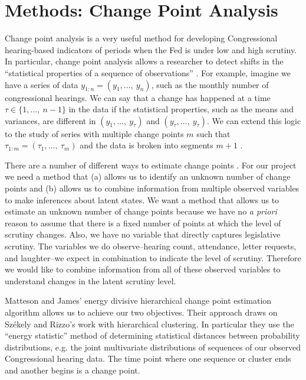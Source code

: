 \documentclass[a4paper]{article}\usepackage[]{graphicx}\usepackage[]{color}
\begin{document}
\section{Methods: Change Point Analysis}

Change point analysis is a very useful method for developing Congressional hearing-based indicators of periods when the Fed is under low and high scrutiny. In particular, change point analysis allows a researcher to detect shifts in the ``statistical properties of a sequence of observations'' \cite[2]{Killick2013}. For example, imagine we have a series of data $y_{1:n} = (y_{1},\ldots,\: y_{n})$, such as the monthly number of congressional hearings.  We can say that a change has happened at a time $\tau \in \{1,\ldots,\:n-1\}$ in the data if the statistical properties, such as the means and variances, are different in $(y_{1},\ldots,\: y_{\tau})$ and $(y_{\tau},\ldots,\: y_{\tau})$. We can extend this logic to the study of series with multiple change points $m$ such that $\tau_{1:m} = (\tau_{1},\ldots,\:\tau_{m})$ and the data is broken into segments $m + 1$ \citep{Killick2012}.

There are a number of different ways to estimate change points \cite[see][]{Killick2013,Matteson2014}. For our project we need a method that (a) allows us to identify an unknown number of change points and (b) allows us to combine information from multiple observed variables to make inferences about latent states. We want a method that allows us to estimate an unknown number of change points because we have no \emph{a priori} reason to assume that there is a fixed number of points at which the level of scrutiny changes. Also, we have no variable that directly captures legislative scrutiny. The variables we do observe--hearing count, attendance, letter requests, and laughter--we expect in combination to indicate the level of scrutiny. Therefore we would like to combine information from all of these observed variables to understand changes in the latent scrutiny level.

Matteson and James' \citeyearpar{Matteson2014} energy divisive hierarchical change point estimation algorithm allows us to achieve our two objectives. Their approach draws on Sz{\'e}kely and Rizzo's \citeyearpar{Szekely2005} work with hierarchical clustering. In particular they use the ``energy statistic'' method of determining statistical distances between probability distributions, e.g. the joint multivariate distributions of sequences of our observed Congressional hearing data. The time point where one sequence or cluster ends and another begins is a change point.
\end{document}
